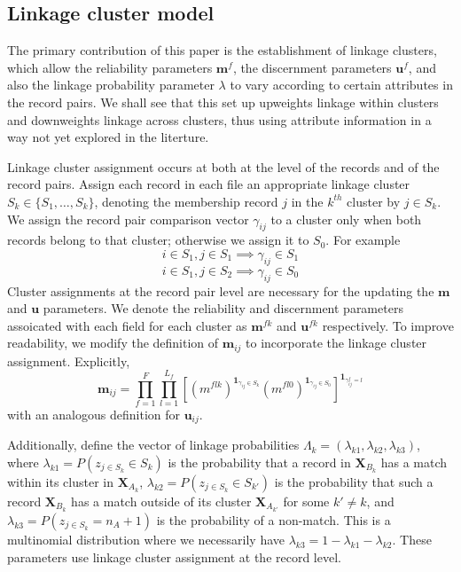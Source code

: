 \documentclass[
  12pt,
]{article}
\begin{document}
\hypertarget{linkage-cluster-model}{%
\subsection{Linkage cluster model}\label{linkage-cluster-model}}

The primary contribution of this paper is the establishment of linkage
clusters, which allow the reliability parameters \(\mathbf{m}^f\), the
discernment parameters \(\mathbf{u}^f\), and also the linkage
probability parameter \(\lambda\) to vary according to certain
attributes in the record pairs. We shall see that this set up upweights
linkage within clusters and downweights linkage across clusters, thus
using attribute information in a way not yet explored in the literture.

Linkage cluster assignment occurs at both at the level of the records
and of the record pairs. Assign each record in each file an appropriate
linkage cluster \(S_k \in \{S_1, \ldots, S_k\}\), denoting the
membership record \(j\) in the \(k^{th}\) cluster by \(j \in S_k\). We
assign the record pair comparison vector \(\gamma_{ij}\) to a cluster
only when both records belong to that cluster; otherwise we assign it to
\(S_0\). For example
\[i \in S_1, j \in S_1 \implies \gamma_{ij} \in S_1\]
\[i \in S_1, j \in S_2 \implies \gamma_{ij} \in S_0\] Cluster
assignments at the record pair level are necessary for the updating the
\(\mathbf{m}\) and \(\mathbf{u}\) parameters. We denote the reliability
and discernment parameters assoicated with each field for each cluster
as \(\mathbf{m}^{fk}\) and \(\mathbf{u}^{fk}\) respectively. To improve
readability, we modify the definition of \(\mathbf{m}_{ij}\) to
incorporate the linkage cluster assignment. Explicitly,
\[\mathbf{m}_{ij} = \prod_{f=1}^{F}\prod_{l=1}^{L_f}\left[ \left(m^{flk}\right)^{\mathbf{1}_{\gamma_{ij} \in S_k}}\left(m^{fl0}\right)^{\mathbf{1}_{\gamma_{ij} \in S_0}}\right]^{\mathbf{1}_{\gamma_{ij}^f = l}}\]
with an analogous definition for \(\mathbf{u}_{ij}\).

Additionally, define the vector of linkage probabilities
\(\Lambda_k = (\lambda_{k1}, \lambda_{k2}, \lambda_{k3})\), where
\(\lambda_{k1} = P(z_{j\in S_k} \in S_k)\) is the probability that a
record in \(\mathbf{X}_{B_k}\) has a match within its cluster in
\(\mathbf{X}_{A_k}\), \(\lambda_{k2} = P(z_{j \in S_k} \in S_{k'})\) is
the probability that such a record \(\mathbf{X}_{B_k}\) has a match
outside of its cluster \(\mathbf{X}_{A_{k'}}\) for some \(k' \neq k\),
and \(\lambda_{k3} = P(z_{j\in S_k} = n_A + 1)\) is the probability of a
non-match. This is a multinomial distribution where we necessarily have
\(\lambda_{k3} = 1 - \lambda_{k1} - \lambda_{k2}\). These parameters use
linkage cluster assignment at the record level.
\end{document}
